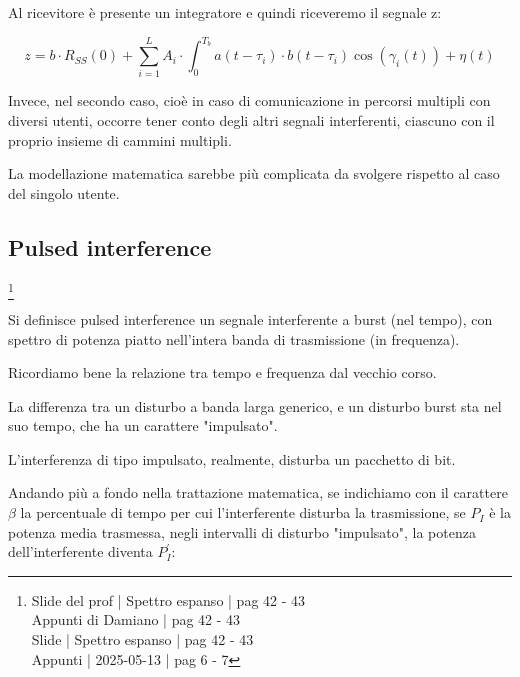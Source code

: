 Al ricevitore è presente un integratore e quindi riceveremo il segnale z: 

{
    \Large 
    \begin{equation}
        z 
        = 
        b \cdot R_{SS} (0)
        + 
        \sum_{i = 1}^{L}
        A_i 
        \cdot
        \int_{0}^{T_b} 
        a(t - \tau_i)
        \cdot 
        b(t - \tau_i)
        \cos(\gamma_i (t))
        + 
        \eta(t)
    \end{equation}
}

Invece, nel secondo caso, cioè in caso di comunicazione in percorsi multipli con diversi utenti, 
occorre tener conto degli altri segnali interferenti, 
ciascuno con il proprio insieme di cammini multipli. \newline 

La modellazione matematica sarebbe più complicata da svolgere rispetto al caso del singolo utente. \newline 

\newpage 

\subsection{Pulsed interference}
\footnote{Slide del prof | Spettro espanso | pag 42 - 43\\
Appunti di Damiano | pag 42 - 43\\
Slide | Spettro espanso | pag 42 - 43 \\
Appunti | 2025-05-13 | pag 6 - 7
} 

Si definisce pulsed interference un segnale interferente a burst (nel tempo), 
con spettro di  potenza piatto nell'intera banda di trasmissione (in frequenza). \newline 

\begin{tcolorbox}
    Ricordiamo bene la relazione tra tempo e frequenza dal vecchio corso.
\end{tcolorbox}

La differenza tra un disturbo a banda larga generico, 
e un disturbo burst sta nel suo tempo, che ha un carattere "impulsato". \newline 

L'interferenza di tipo impulsato, realmente, disturba un pacchetto di bit. \newline 

Andando più a fondo nella trattazione matematica, 
se indichiamo con il carattere $\beta$ la percentuale di tempo per cui l'interferente 
disturba la trasmissione, 
se $P_I$ è la potenza media trasmessa, 
negli intervalli di disturbo "impulsato", 
la potenza dell'interferente diventa $P_I^{'}$:

